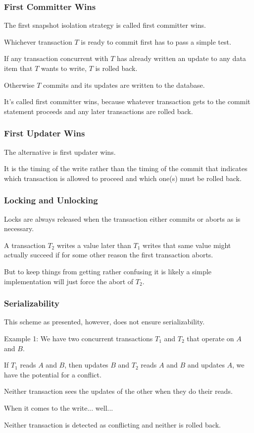 \begin{frame}
\frametitle{First Committer Wins}
The first snapshot isolation strategy is called \alert{first committer wins}.

Whichever transaction $T$ is ready to commit first has to pass a simple test. 

If any transaction concurrent with $T$ has already written an update to any data item that $T$ wants to write, $T$ is rolled back. 

Otherwise $T$ commits and its updates are written to the database. 

It's called first committer wins, because whatever transaction gets to the commit statement proceeds and any later transactions are rolled back.

\end{frame}

\begin{frame}
\frametitle{First Updater Wins}

The alternative is \alert{first updater wins}.

It is the timing of the write rather than the timing of the commit that indicates which transaction is allowed to proceed and which one(s) must be rolled back.  


\end{frame}

\begin{frame}
\frametitle{Locking and Unlocking}
Locks are always released when the transaction either commits or aborts as is necessary. 

A transaction $T_{2}$ writes a value later than $T_{1}$ writes that same value might actually succeed if for some other reason the first transaction aborts. 

But to keep things from getting rather confusing it is likely a simple implementation will just force the abort of $T_{2}$.


\end{frame}


\begin{frame}
\frametitle{Serializability}
This scheme as presented, however, does not ensure serializability.


Example 1: We have two concurrent transactions $T_{1}$ and $T_{2}$ that operate on $A$ and $B$. 

If $T_{1}$ reads $A$ and $B$, then updates $B$ and $T_{2}$ reads $A$ and $B$ and updates $A$, we have the potential for a conflict. 

Neither transaction sees the updates of the other when they do their reads. 

When it comes to the write... well... 

Neither transaction is detected as conflicting and neither is rolled back.

\end{frame}

